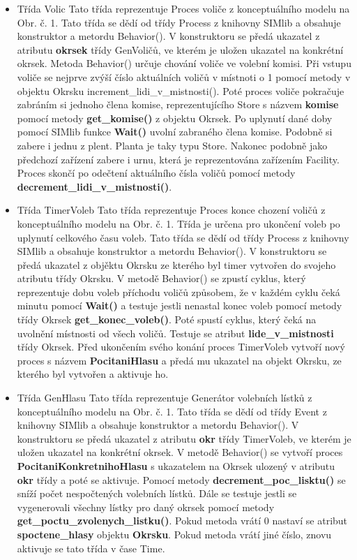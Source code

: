 \documentclass[12pt,a4paper,titlepage,final]{article}
\begin{document}
\begin{itemize}
\item Třída Volic
\subitem Tato třída reprezentuje Proces voliče z konceptuálního modelu na Obr. č. 1. Tato třída se dědí od třídy Process z knihovny SIMlib a obsahuje konstruktor a metordu Behavior(). V konstruktoru se předá ukazatel z atributu \textbf{okrsek} třídy GenVoličů, ve kterém je uložen ukazatel na konkrétní okrsek. Metoda Behavior() určuje chování voliče ve volební komisi. Při vstupu voliče se nejprve zvýší číslo aktuálních voličů v místnoti o 1 pomocí metody v objektu Okrsku increment\_lidi\_v\_mistnosti(). Poté proces voliče pokračuje zabráním si jednoho člena komise, reprezentujícího Store s názvem \textbf{komise} pomocí metody \textbf{get\_komise()} z objektu Okrsek. Po uplynutí dané doby pomocí SIMlib funkce \textbf{Wait()} uvolní zabraného člena komise. Podobně si zabere i jednu z plent. Planta je taky typu Store. Nakonec podobně jako předchozí zařízení zabere i urnu, která je reprezentována zařízením Facility. Proces skončí po odečtení aktuálního čísla voličů pomocí metody \textbf{decrement\_lidi\_v\_mistnosti()}.

\item Třída TimerVoleb
\subitem Tato třída reprezentuje Proces konce chození voličů z konceptuálního modelu na Obr. č. 1. Třída je určena pro ukončení voleb po uplynutí celkového času voleb. Tato třída se dědí od třídy Process z knihovny SIMlib a obsahuje konstruktor a metordu Behavior(). V konstruktoru se předá ukazatel z objěktu Okrsku ze kterého byl timer vytvořen do svojeho atributu třídy Okrsku. V metodě Behavior() se zpustí cyklus, který reprezentuje dobu voleb příchodu voličů způsobem, že v každém cyklu čeká minutu pomocí \textbf{Wait()} a testuje jestli nenastal konec voleb pomocí metody třídy Okrsek \textbf{get\_konec\_voleb()}. Poté spustí cyklus, který čeká na uvolnění místnosti od všech voličů. Testuje se atribut \textbf{lide\_v\_mistnosti} třídy Okrsek. Před ukončením svého konání proces TimerVoleb vytvoří nový proces s názvem \textbf{PocitaniHlasu} a předá mu ukazatel na objekt Okrsku, ze kterého byl vytvořen a aktivuje ho.

\item Třída GenHlasu
\subitem Tato třída reprezentuje Generátor volebních lístků z konceptuálního modelu na Obr. č. 1. Tato třída se dědí od třídy Event z knihovny SIMlib a obsahuje konstruktor a metordu Behavior(). V konstruktoru se předá ukazatel z atributu \textbf{okr} třídy TimerVoleb, ve kterém je uložen ukazatel na konkrétní okrsek. V metodě Behavior() se vytvoří proces \textbf{PocitaniKonkretnihoHlasu} s ukazatelem na Okrsek ulozený v atributu \textbf{okr} třídy a poté se aktivuje. Pomocí metody \textbf{decrement\_poc\_lisktu()} se sníží počet nespočtených volebních lístků. Dále se testuje jestli se vygenerovali všechny lístky pro daný okrsek pomocí metody \textbf{get\_poctu\_zvolenych\_listku()}. Pokud metoda vrátí 0 nastaví se atribut \textbf{spoctene\_hlasy} objektu \textbf{Okrsku}. Pokud metoda vrátí jiné číslo, znovu aktivuje se tato třída v čase Time.


\end{itemize}
\end{document}
